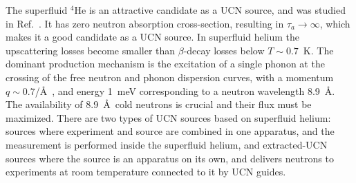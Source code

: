 The superfluid $^4$He is an attractive candidate as a UCN source, and
was studied in Ref.~\cite{Golub77}.  It has zero neutron absorption
cross-section, resulting in $\tau_a \rightarrow \infty$, which makes it
a good candidate as a UCN source.  In superfluid helium the upscattering
losses become smaller than $\beta$-decay losses below $T \sim 0.7$~K.
The dominant production mechanism is the excitation of a single phonon
at the crossing of the free neutron and phonon dispersion curves, with
a momentum $q\sim 0.7$/\AA~\cite{Brome2001}, and energy 1~meV
corresponding to a neutron wavelength 8.9~\AA. The availability of
8.9~\AA~cold neutrons is crucial and their flux must be maximized.
There are two types of UCN sources based on superfluid helium: sources
where experiment and source are combined in one apparatus, and the
measurement is performed inside the superfluid helium, and
extracted-UCN sources where the source is an apparatus on its own, and
delivers neutrons to experiments at room temperature connected to it
by UCN guides.



